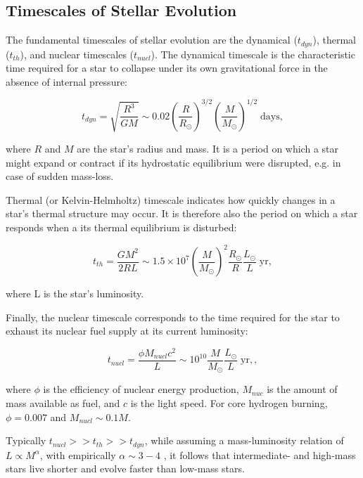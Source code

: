 \subsection{Timescales of Stellar Evolution}\label{subsec:timescales}

The fundamental timescales of stellar evolution are the dynamical ($t_{dyn}$), thermal ($t_{th}$), and nuclear timescales ($t_{nucl}$). The dynamical timescale is the characteristic time required for a star to collapse under its own gravitational force in the absence of internal pressure:

\begin{equation}\label{eq:dynamical_timsecale}
    t_{dyn} = \sqrt{\frac{R^3}{GM}} \sim 0.02 \left( \frac{R}{R_{\odot}} \right)^{3/2} \left( \frac{M}{M_{\odot}}\right)^{1/2} \; \text{days},
\end{equation}

where $R$ and $M$ are the star's radius and mass. It is a period on which a star might expand or contract if its hydrostatic equilibrium were disrupted, e.g. in case of sudden mass-loss.

Thermal (or Kelvin-Helmholtz) timescale indicates how quickly changes in a star's thermal structure may occur. It is therefore also the period on which a star responds when a its thermal equilibrium is disturbed:

\begin{equation}\label{eq:thermal_timsecale}
    t_{th} = \frac{G M^2}{2RL} \sim 1.5 \times 10^7 \left( \frac{M}{M_{\odot}} \right)^{2} \frac{R_{\odot}}{R} \frac{L_{\odot}}{L} \; \text{yr},
\end{equation}

where L is the star's luminosity.

Finally, the nuclear timescale corresponds to the time required for the star to exhaust its nuclear fuel supply at its current luminosity: 

\begin{equation}\label{eq:nuclear_timsecale}
    t_{nucl} = \frac{\phi M_{nucl} c^2}{L} \sim 10^{10} \frac{M}{M_{\odot}} \frac{L_{\odot}}{L} \; \text{yr},,
\end{equation}

where $\phi$ is the efficiency of nuclear energy production, $M_{nuc}$ is the amount of mass available as fuel, and $c$ is the light speed. For core hydrogen burning, $\phi = 0.007$ and $M_{nucl} \sim 0.1 M$.

Typically $t_{nucl} >> t_{th} >> t_{dyn}$, while assuming a mass-luminosity relation of $L \propto M^{\alpha}$, with empirically $\alpha \sim 3-4$ \citep{eker2015main}, it follows that intermediate- and high-mass stars live shorter and evolve faster than low-mass stars.

